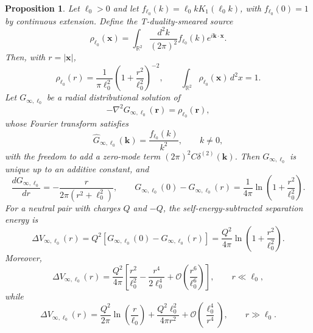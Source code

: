 \documentclass[openacc]{rsproca_new}%
\newtheorem{proposition}{\bf Proposition}[section]
\begin{document}
\begin{proposition}\label{prop:infinite-plane-td}
Let $\ell_0>0$ and let $f_{\ell_0}(k)=\ell_0 kK_1(\ell_0 k)$, with $f_{\ell_0}(0)=1$ by continuous extension. Define the T-duality-smeared source
\begin{equation}
  \rho_{\ell_0}(\mathbf x)
  =\int_{\mathbb R^2}\frac{d^2k}{(2\pi)^2}f_{\ell_0}(k)e^{i\mathbf k\cdot\mathbf x}.
\end{equation}
Then, with $r=|\mathbf x|$,
\begin{equation}\label{density}
  \rho_{\ell_0}(r)
  =\frac{1}{\pi\ell_0^2}\left(1+\frac{r^2}{\ell_0^2}\right)^{-2},
  \qquad
  \int_{\mathbb R^2}\rho_{\ell_0}(\mathbf x)\,d^2x=1.
\end{equation}
Let $G_{\infty,\ell_0}$ be a radial distributional solution of
\begin{equation}\label{Poisson}
  -\nabla^2G_{\infty,\ell_0}(\mathbf r)=\rho_{\ell_0}(\mathbf r),
\end{equation}
whose Fourier transform satisfies
\begin{equation}
  \widehat G_{\infty,\ell_0}(\mathbf k)
  =\frac{f_{\ell_0}(k)}{k^2},
  \qquad k\neq 0,
\end{equation}
with the freedom to add a zero-mode term $(2\pi)^2C\delta^{(2)}(\mathbf k)$. Then $G_{\infty,\ell_0}$ is unique up to an additive constant, and
\begin{equation}\label{equa}
  \frac{dG_{\infty,\ell_0}}{dr}
  =-\frac{r}{2\pi(r^2+\ell_0^2)},
  \qquad
  G_{\infty,\ell_0}(0)-G_{\infty,\ell_0}(r)
  =\frac{1}{4\pi}\ln\left(1+\frac{r^2}{\ell_0^2}\right).
\end{equation}
For a neutral pair with charges $Q$ and $-Q$, the self-energy-subtracted separation energy is
\begin{equation}\label{DeltaV}
  \Delta V_{\infty,\ell_0}(r)
  =Q^2\left[G_{\infty,\ell_0}(0)-G_{\infty,\ell_0}(r)\right]
  =\frac{Q^2}{4\pi}\ln\left(1+\frac{r^2}{\ell_0^2}\right).
\end{equation}
Moreover,
\begin{equation}
  \Delta V_{\infty,\ell_0}(r)
  =\frac{Q^2}{4\pi}\left[
  \frac{r^2}{\ell_0^2}-\frac{r^4}{2\ell_0^4}
  +\mathcal O\left(\frac{r^6}{\ell_0^6}\right)\right],
  \qquad r\ll\ell_0,
\end{equation}
while
\begin{equation}
  \Delta V_{\infty,\ell_0}(r)
  =\frac{Q^2}{2\pi}\ln\left(\frac r{\ell_0}\right)
  +\frac{Q^2\ell_0^2}{4\pi r^2}
  +\mathcal O\left(\frac{\ell_0^4}{r^4}\right),
  \qquad r\gg\ell_0.
\end{equation}
\end{proposition}
\end{document}
